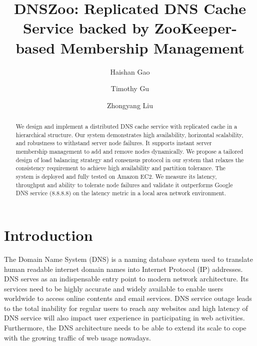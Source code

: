 \documentclass[format=sigconf,nonacm,screen]{acmart}
\begin{document}
\title{DNSZoo: Replicated DNS Cache Service backed by ZooKeeper-based Membership Management}

\author{Haishan Gao}

\author{Timothy Gu}

\author{Zhongyang Liu}

\begin{abstract}    
\small We design and implement a distributed DNS cache service with replicated cache in a hierarchical structure. Our system demonstrates high availability, horizontal scalability, and robustness to withstand server node failures. It supports instant server membership management to add and remove nodes dynamically. We propose a tailored design of load balancing strategy and consensus protocol in our system that relaxes the consistency requirement to achieve high availability and partition tolerance. The system is deployed and fully tested on Amazon EC2. We measure its latency, throughput and ability to tolerate node failures and validate it outperforms Google DNS service (8.8.8.8) on the latency metric in a local area network environment.
\end{abstract}

\maketitle

\fontsize{11}{11}\selectfont

\section{Introduction}
The Domain Name System (DNS) is a naming database system used to translate human readable internet domain names into Internet Protocol (IP) addresses. DNS serves as an indispensable entry point to modern network architecture. Its services need to be highly accurate and widely available to enable users worldwide to access online contents and email services. DNS service outage leads to the total inability for regular users to reach any websites and high latency of DNS service will also impact user experience in participating in web activities. Furthermore, the DNS architecture needs to be able to extend its scale to cope with the growing traffic of web usage nowadays.
\end{document}
